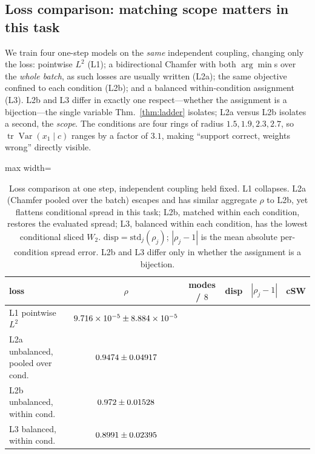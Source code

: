 \documentclass{article}
\newcommand{\tblstyle}[1]{%
  \begin{adjustbox}{max width=\columnwidth}%
  \footnotesize\setlength{\tabcolsep}{4pt}%
  #1%
  \end{adjustbox}}
\theoremstyle{plain}
\newcommand{\tr}{\operatorname{tr}}
\newcommand{\Var}{\operatorname{Var}}
\begin{document}
\subsection{Loss comparison: matching scope matters in this task}
\label{sec:exladder}

We train four one-step models on the \emph{same} independent coupling, changing only the
loss: pointwise $L^2$ (L1); a bidirectional Chamfer with both $\arg\min$s over the
\emph{whole batch}, as such losses are usually written (L2a); the same objective confined
to each condition (L2b); and a balanced within-condition assignment (L3). L2b and L3 differ
in exactly one respect---whether the assignment is a bijection---the single variable
Thm.~\ref{thm:ladder} isolates; L2a versus L2b isolates a second, the \emph{scope}. The
conditions are four rings of radius $1.5,1.9,2.3,2.7$, so $\tr\Var(x_1\mid c)$ ranges by a
factor of $3.1$, making ``support correct, weights wrong'' directly visible.

\begin{table}[t]
\centering
\caption{Loss comparison at one step, independent coupling held fixed. L1 collapses. L2a
(Chamfer pooled over the batch) escapes and has similar aggregate $\rho$ to L2b, yet
flattens conditional spread in this task; L2b, matched within each condition, restores
the evaluated spread; L3, balanced within each condition, has the lowest conditional sliced $W_2$.
$\mathrm{disp}=\mathrm{std}_j(\rho_j)$; $|\rho_j-1|$ is the mean absolute per-condition
spread error. L2b and L3 differ only in whether the assignment is a bijection.}
\label{tab:ladder}
\vskip 0.05in
\tblstyle{
\begin{tabular}{lccccc}
\toprule
loss & $\rho$ & modes / $8$ & disp & $|\rho_j\!-\!1|$ & cSW \\
\midrule
L1 pointwise $L^2$ & $9.716\times 10^{-5}{}\pm8.884\times 10^{-5}$ & \LLLtwoCov & \LLLtwoDisp & \LLLtwoAbsErr & \LLLtwoCsw \\
L2a unbalanced, pooled over cond. & $0.9474{}\pm0.04917$ & \LLChamferPooledCov & \LLChamferPooledDisp & \LLChamferPooledAbsErr & \LLChamferPooledCsw \\
L2b unbalanced, within cond. & $0.972{}\pm0.01528$ & \LLChamferCov & \LLChamferDisp & \LLChamferAbsErr & \LLChamferCsw \\
L3 balanced, within cond. & $0.8991{}\pm0.02395$ & \LLBalCov & \LLBalDisp & \LLBalAbsErr & \LLBalCsw \\
\bottomrule
\end{tabular}}
\end{table}
\end{document}
